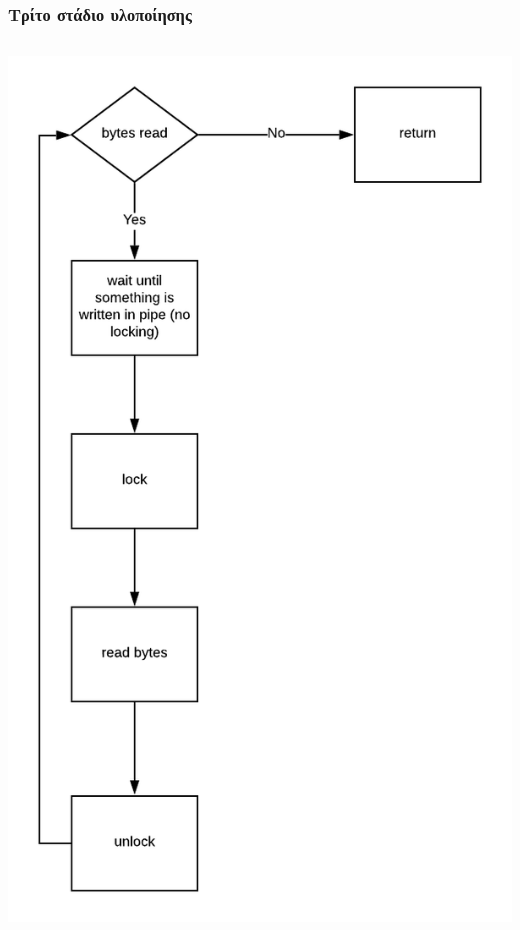 \documentclass[red,slidestop,notes,compress,mathserif]{beamer}
\begin{document}
\begin{frame}
\frametitle{Τρίτο στάδιο υλοποίησης}
\begin{columns}
\includegraphics[scale=0.4]{figures/pipe_read.png}

\end{columns}
\end{frame}
\end{document}
